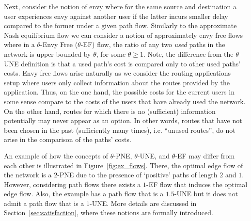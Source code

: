 Next, consider the notion of envy where for the same source and destination a user experiences envy against another user if the latter incurs smaller delay compared to the former under a given path flow. Similarly to the approximate Nash equilibrium flow we can consider a notion of approximately envy free flows where in a $\theta$-Envy Free ($\theta$-EF) flow, the ratio of any two {\em used} paths in the network is upper bounded by $\theta$, for some $\theta\geq 1$.  Note, the difference from the $\theta$-UNE definition is that a used path's cost is compared only to other used paths' costs. 
Envy free flows arise naturally as we consider the routing applications setup where users only collect information about the routes provided by the application. Thus, on the one hand, the possible costs for the current users in some sense compare to the costs of the users that have already used the network. On the other hand, routes for which there is no (sufficient) information potentially may never appear as an option. In other words, routes that have not been chosen in the past (sufficiently many times), i.e. ``unused routes'', do not arise in the comparison of the paths' costs. 

An example of how the concepts of $\theta$-PNE, $\theta$-UNE, and $\theta$-EF may differ from each other is illustrated in Figure~\ref{fig:ex_flows}. There, the optimal edge flow of the network is a $2$-PNE due to the presence of `positive' paths of length $2$ and $1$. However, considering path flows there exists a $1$-EF flow that induces  the optimal edge flow.  Also, the example has a path flow that is a $1.5$-UNE but it does not admit a path flow that is a $1$-UNE. More details  are discussed in Section~\ref{sec:satisfaction}, where these notions are formally introduced. 






